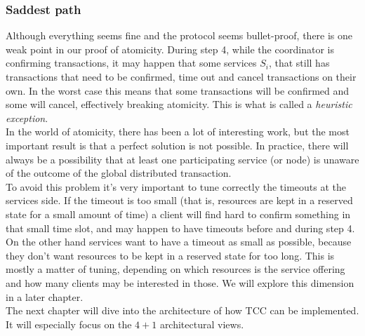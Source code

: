 \subsubsection{Saddest path}
Although everything seems fine and the protocol seems bullet-proof, there is one weak point in our proof of atomicity. During step 4, while the coordinator is confirming transactions, it may happen that some services $S_i$, that still has transactions that need to be confirmed, time out and cancel transactions on their own. In the worst case this means that some transactions will be confirmed and some will cancel, effectively breaking atomicity. This is what is called a \textit{heuristic exception}.\\
In the world of atomicity, there has been a lot of interesting work, but the most important result is that a perfect solution is not possible. In practice, there will always be a possibility that at least one participating service (or node) is unaware of the outcome of the global distributed transaction.\\
To avoid this problem it's very important to tune correctly the timeouts at the services side. If the timeout is too small (that is, resources are kept in a reserved state for a small amount of time) a client will find hard to confirm something in that small time slot, and may happen to have timeouts before and during step 4. On the other hand services want to have a timeout as small as possible, because they don't want resources to be kept in a reserved state for too long. This is mostly a matter of tuning, depending on which resources is the service offering and how many clients may be interested in those. We will explore this dimension in a later chapter.\\
The next chapter will dive into the architecture of how TCC can be implemented. It will especially focus on the $4+1$ architectural views.